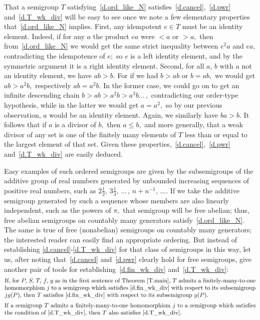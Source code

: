 \documentclass{amsart}
\numberwithin{equation}{section}
\numberwithin{theorem}{section}
\newcommand{\2}{\mathbf{2}}
\begin{document}
That a semigroup $T$ satisfying~\eqref{d.ord_like_N}
satisfies~\eqref{d.cancel},~\eqref{d.pwr} and~\eqref{d.T_wk_div}
will be easy to see once we note
a few elementary properties that~\eqref{d.ord_like_N} implies.
First, any idempotent $e\in T$ must be an identity element.
Indeed, if for any $a$ the product $ea$ were $<a$ or $>a,$
then from~\eqref{d.ord_like_N} we would get the same strict inequality
between $e^2 a$ and $ea,$ contradicting the
idempotence of $e;$ so $e$ is a left identity
element, and by the symmetric argument it is a right identity element.
Second, for all $a,\,b$ with $a$ not
an identity element, we have $ab > b.$
For if we had $b > ab$ or $b = ab,$ we would
get $ab > a^2 b,$ respectively $ab = a^2 b.$
In the former case, we could go on to get an infinite descending
chain $b > ab > a^2 b > a^3 b \dots\,,$
contradicting our order-type hypothesis,
while in the latter we would get $a = a^2,$ so
by our previous observation, $a$ would be an identity element.
Again, we similarly have $ba > b.$
It follows that if $a$ is a divisor of $b,$ then $a\leq b,$
and more generally, that a weak divisor of any set
is one of the finitely many elements of $T$ less than or equal to
the largest element of that set.
Given these properties,~\eqref{d.cancel},~\eqref{d.pwr}
and~\eqref{d.T_wk_div} are easily deduced.

Easy examples of such ordered semigroups are given by the
subsemigroups of the additive group of real numbers generated by
unbounded increasing sequences of positive real numbers, such as
$2\frac{1}{2},\,3\frac{1}{3},\,\dots\,,\,{n+n^{-1},}\,\dots.$
If we take the additive semigroup generated by such a sequence
whose members are also linearly independent, such as the powers of
$\pi,$ that semigroup will be free abelian; thus, free abelian
semigroups on countably many generators satisfy~\eqref{d.ord_like_N}.
The same is true of free (nonabelian) semigroups
on countably many generators;
the interested reader can easily find an appropriate ordering.
But instead of establishing \eqref{d.cancel}-\eqref{d.T_wk_div}
for that class of semigroups in this way, let us, after noting
that~\eqref{d.cancel} and~\eqref{d.pwr} clearly hold for
free semigroups, give another pair of
tools for establishing~\eqref{d.fin_wk_div} and~\eqref{d.T_wk_div}:
%
\begin{equation}\begin{minipage}[c]{35pc}\label{d.fin_to_1'}
If, for $P,$ $S,$ $T,$ $f,$ $g$ as in the first sentence
of Theorem~\ref{T.main},
$T$ admits a finitely-many-to-one homomorphism $j$
to a semigroup which satisfies~\eqref{d.fin_wk_div} with respect to its
subsemigroup $jg(P),$ then $T$ satisfies~\eqref{d.fin_wk_div} with
respect to its subsemigroup~$g(P).$
\end{minipage}\end{equation}
%
\begin{equation}\begin{minipage}[c]{35pc}\label{d.fin_to_1}
If a semigroup $T$ admits a finitely-many-to-one homomorphism $j$
to a semigroup which satisfies the condition of~\eqref{d.T_wk_div},
then $T$ also satisfies~\eqref{d.T_wk_div}.
\end{minipage}\end{equation}
\end{document}
